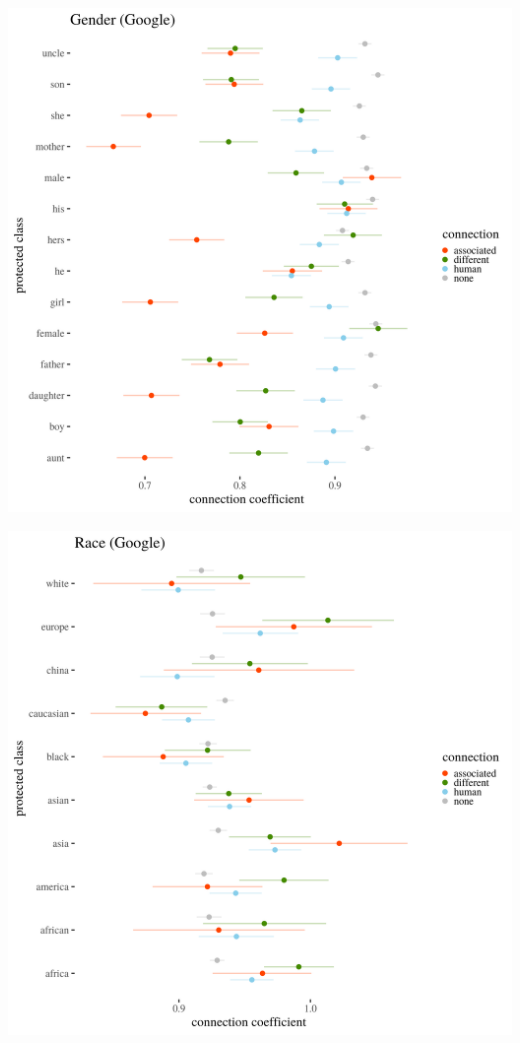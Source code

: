 \documentclass[12pt,]{book}
\begin{document}
\includegraphics[width=14cm]{../images/visGenderGoogle.png}

\includegraphics[width=14cm]{../images/visRaceGoogle.png}
\end{document}

